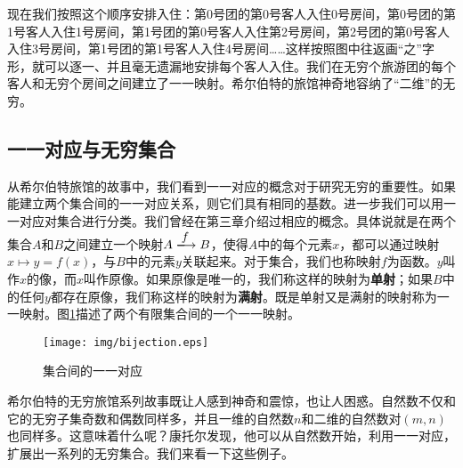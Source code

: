 \documentclass{article}
\begin{document}
现在我们按照这个顺序安排入住：第0号团的第0号客人入住0号房间，第0号团的第1号客人入住1号房间，第1号团的第0号客人入住第2号房间，第2号团的第0号客人入住3号房间，第1号团的第1号客人入住4号房间……这样按照图中往返画“之”字形，就可以逐一、并且毫无遗漏地安排每个客人入住。我们在无穷个旅游团的每个客人和无穷个房间之间建立了一一映射。希尔伯特的旅馆神奇地容纳了“二维”的无穷。

\begin{Exercise}
\end{Exercise}

\subsection{一一对应与无穷集合}

从希尔伯特旅馆的故事中，我们看到一一对应的概念对于研究无穷的重要性。如果能建立两个集合间的一一对应关系，则它们具有相同的基数。进一步我们可以用一一对应对集合进行分类。我们曾经在第三章介绍过相应的概念。具体说就是在两个集合$A$和$B$之间建立一个映射$A \arrowto{f} B$，使得$A$中的每个元素$x$，都可以通过映射$x \mapsto y = f(x)$，与$B$中的元素$y$关联起来。对于集合，我们也称映射$f$为函数。$y$叫作$x$的像，而$x$叫作原像。如果原像是唯一的，我们称这样的映射为\textbf{单射}；如果$B$中的任何$y$都存在原像，我们称这样的映射为\textbf{满射}。既是单射又是满射的映射称为一一映射。图\ref{fig:bijection}描述了两个有限集合间的一个一一映射。

\begin{figure}[htbp]
 \centering
 \texttt{[image: img/bijection.eps]}
 \caption{集合间的一一对应}
 \label{fig:bijection}
\end{figure}

希尔伯特的无穷旅馆系列故事既让人感到神奇和震惊，也让人困惑。自然数不仅和它的无穷子集奇数和偶数同样多，并且一维的自然数$n$和二维的自然数对$(m, n)$也同样多。这意味着什么呢？康托尔发现，他可以从自然数开始，利用一一对应，扩展出一系列的无穷集合。我们来看一下这些例子。
\end{document}
